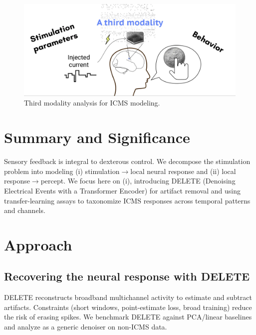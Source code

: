 \documentclass[12pt,oneside]{report}
\begin{document}
\begin{figure}[h]
  \centering
  \includegraphics[width=0.5\linewidth]{ch4_third_modality.png}
  \caption{Third modality analysis for ICMS modeling.}
  \label{fig:third_modality}
\end{figure}

\section{Summary and Significance}
Sensory feedback is integral to dexterous control. We decompose the stimulation problem into modeling (i) stimulation$\to$local neural response and (ii) local response$\to$percept. We focus here on (i), introducing DELETE (Denoising Electrical Events with a Transformer Encoder) for artifact removal and using transfer-learning assays to taxonomize ICMS responses across temporal patterns and channels.

\section{Approach}
\subsection*{Recovering the neural response with DELETE}
DELETE reconstructs broadband multichannel activity to estimate and subtract artifacts. Constraints (short windows, point-estimate loss, broad training) reduce the risk of erasing spikes. We benchmark DELETE against PCA/linear baselines and analyze as a generic denoiser on non-ICMS data.
\end{document}
